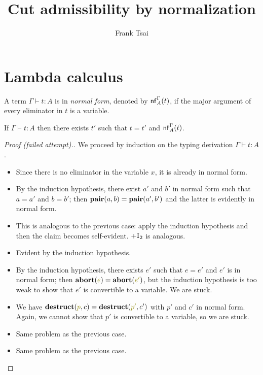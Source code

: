 \documentclass[a4paper]{article}
\title{Cut admissibility by normalization}
\author{Frank Tsai}
\begin{document}
\maketitle

\section{Lambda calculus}
\label{sec:0001}

\begin{definition}
  A term $\Gamma \vdash t : A$ is in \emph{normal form}, denoted by $\operatorname{\mathsf{nf}}^{\Gamma}_{A}(t)$, if the major argument of every eliminator in $t$ is a variable.
\end{definition}

\begin{theorem}
  If $\Gamma \vdash t : A$ then there exists $t'$ such that $t = t'$ and $\operatorname{\mathsf{nf}}^{\Gamma}_{A}(t)$.
\end{theorem}
\begin{proof}[Proof (failed attempt).]
  We proceed by induction on the typing derivation $\Gamma \vdash t : A$.
  \begin{itemize}
  \item[\rVar] Since there is no eliminator in the variable $x$, it is already in normal form.
  \item[\rProdI] By the induction hypothesis, there exist $a'$ and $b'$ in normal form such that $a = a'$ and $b = b'$; then $\operatorname{\mathbf{pair}}(a,b) = \operatorname{\mathbf{pair}}(a',b')$ and the latter is evidently in normal form.
  \item[\rSumIl] This is analogous to the previous case: apply the induction hypothesis and then the claim becomes self-evident.
    $\textsc{$+\text{I}_2$}$ is analogous.
  \item[\rFunI] Evident by the induction hypothesis.
  \item[\rEmpE] By the induction hypothesis, there exists $e'$ such that $e = e'$ and $e'$ is in normal form; then $\tmAbort{e} = \tmAbort{e'}$, but the induction hypothesis is too weak to show that $e'$ is convertible to a variable.
    We are stuck.
  \item[\rProdE] We have $\tmDestruct{p}{c} = \tmDestruct{p'}{c'}$ with $p'$ and $c'$ in normal form.
    Again, we cannot show that $p'$ is convertible to a variable, so we are stuck.
  \item[\rSumE] Same problem as the previous case.
  \item[\rFunE] Same problem as the previous case.
  \end{itemize}
\end{proof}
\end{document}
